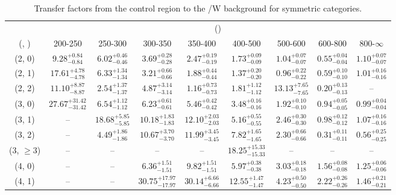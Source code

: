 \begin{table}[h!]
\tiny
\centering
\caption{Transfer factors from the \mmj control region to the \ttbar/W background for symmetric categories.\label{tab:tf_mumu_ttw_sym}}
\begin{tabular}
{ccccccccc}
	\hline\hline
	& \multicolumn{8}{c}{\scalht (\gev)} \\ 
	 (\njet,  \nb) & 200-250 & 250-300 & 300-350 & 350-400 & 400-500 & 500-600 & 600-800 & 800-$\infty$ \\ [0.8ex] 
\hline
	(2, 0) & $9.28^{+ 0.84 }_{- 0.84 }$ & $6.02^{+ 0.46 }_{- 0.46 }$ & $3.69^{+ 0.28 }_{- 0.28 }$ & $2.47^{+ 0.19 }_{- 0.19 }$ & $1.73^{+ 0.09 }_{- 0.09 }$ & $1.04^{+ 0.07 }_{- 0.07 }$ & $0.55^{+ 0.04 }_{- 0.04 }$ & $1.10^{+ 0.07 }_{- 0.07 }$ \\[0.5ex] 
	(2, 1) & $17.61^{+ 4.78 }_{- 4.78 }$ & $6.33^{+ 1.34 }_{- 1.34 }$ & $3.21^{+ 0.66 }_{- 0.66 }$ & $1.88^{+ 0.44 }_{- 0.44 }$ & $1.37^{+ 0.20 }_{- 0.20 }$ & $0.96^{+ 0.22 }_{- 0.22 }$ & $0.59^{+ 0.10 }_{- 0.10 }$ & $1.01^{+ 0.16 }_{- 0.16 }$ \\[0.5ex] 
	(2, 2) & $11.10^{+ 8.87 }_{- 8.87 }$ & $2.54^{+ 1.37 }_{- 1.37 }$ & $4.87^{+ 3.14 }_{- 3.14 }$ & $1.16^{+ 0.73 }_{- 0.73 }$ & $1.81^{+ 1.12 }_{- 1.12 }$ & $13.13^{+ 7.65 }_{- 7.65 }$ & $0.20^{+ 0.13 }_{- 0.13 }$ & -- \\[0.5ex] 
	(3, 0) & $27.67^{+ 31.42 }_{- 31.42 }$ & $6.54^{+ 1.12 }_{- 1.12 }$ & $6.23^{+ 0.61 }_{- 0.61 }$ & $5.46^{+ 0.42 }_{- 0.42 }$ & $3.48^{+ 0.16 }_{- 0.16 }$ & $1.92^{+ 0.10 }_{- 0.10 }$ & $0.94^{+ 0.05 }_{- 0.05 }$ & $0.99^{+ 0.04 }_{- 0.04 }$ \\[0.5ex] 
	(3, 1) & -- & $18.68^{+ 5.85 }_{- 5.85 }$ & $10.18^{+ 1.83 }_{- 1.83 }$ & $12.10^{+ 2.03 }_{- 2.03 }$ & $5.16^{+ 0.55 }_{- 0.55 }$ & $2.46^{+ 0.30 }_{- 0.30 }$ & $0.98^{+ 0.12 }_{- 0.12 }$ & $1.07^{+ 0.16 }_{- 0.16 }$ \\[0.5ex] 
	(3, 2) & -- & $4.49^{+ 1.86 }_{- 1.86 }$ & $10.67^{+ 3.70 }_{- 3.70 }$ & $11.99^{+ 3.45 }_{- 3.45 }$ & $7.82^{+ 1.65 }_{- 1.65 }$ & $2.30^{+ 0.66 }_{- 0.66 }$ & $0.31^{+ 0.11 }_{- 0.11 }$ & $0.56^{+ 0.25 }_{- 0.25 }$ \\[0.5ex] 
	(3, $\ge3$) & -- & -- & -- & -- & $18.25^{+ 15.33 }_{- 15.33 }$ & -- & -- & -- \\[0.5ex] 
	(4, 0) & -- & -- & $6.36^{+ 1.51 }_{- 1.51 }$ & $9.82^{+ 1.51 }_{- 1.51 }$ & $5.97^{+ 0.38 }_{- 0.38 }$ & $3.03^{+ 0.18 }_{- 0.18 }$ & $1.56^{+ 0.08 }_{- 0.08 }$ & $1.25^{+ 0.06 }_{- 0.06 }$ \\[0.5ex] 
	(4, 1) & -- & -- & $30.75^{+ 17.97 }_{- 17.97 }$ & $30.14^{+ 6.66 }_{- 6.66 }$ & $12.55^{+ 1.47 }_{- 1.47 }$ & $4.23^{+ 0.50 }_{- 0.50 }$ & $2.22^{+ 0.26 }_{- 0.26 }$ & $1.46^{+ 0.21 }_{- 0.21 }$ \\[0.5ex] 

\end{tabular}
\end{table}
